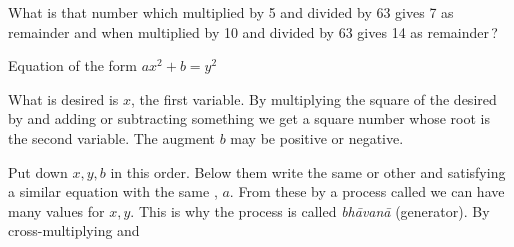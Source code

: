 \documentclass[]{article}
\begin{document}
{{What is that number which multiplied by 5 and divided by 63 gives 7 as
remainder and when multiplied by 10 and divided by 63 gives 14 as
remainder\,?}

\vspace{20pt}
\begin{center}
\begin{Large}
 \label{varga}
{}
\end{Large}
\end{center}
\vspace{5pt}

{Equation of the form $ax^{2} + b = y^{2}$}

\begin{quote}  {
}  \end{quote}

{What is desired is $x$, the first variable. By multiplying the square of
the desired by {} and adding or subtracting something we get a
square number whose root is the second variable. The augment $b$ may be
positive or negative. }

\begin{quote}  {
}  \end{quote}

{Put down $x, y, b$ in this order. Below them write the same or other
{} and {} satisfying a similar equation with the same
{}, $a$. From these by a process called {} we can have many values
for $x, y$. This is why the process is called \textit{bhāvanā} (generator). By
cross-multiplying and }

}
\end{document}
